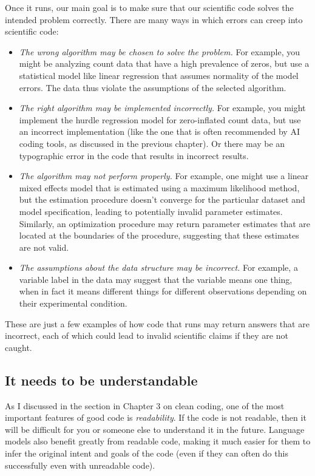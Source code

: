 Once it runs, our main goal is to make sure that our scientific code solves the intended problem correctly.  There are many ways in which errors can creep into scientific code:

\begin{itemize}
\item \textit{The wrong algorithm may be chosen to solve the problem.} For example, you might be analyzing count data that have a high prevalence of zeros, but use a statistical model like linear regression that assumes normality of the model errors.  The data thus violate the assumptions of the selected algorithm.
\item \textit{The right algorithm may be implemented incorrectly.}  For example, you might implement the hurdle regression model for zero-inflated count data, but use an incorrect implementation (like the one that is often recommended by AI coding tools, as discussed in the previous chapter).  Or there may be an typographic error in the code that results in incorrect results.
\item \textit{The algorithm may not perform properly.} For example, one might use a linear mixed effects model that is estimated using a maximum likelihood method, but the estimation procedure doesn't converge for the particular dataset and model specification, leading to potentially invalid parameter estimates.  Similarly, an optimization procedure may return parameter estimates that are located at the boundaries of the procedure, suggesting that these estimates are not valid.
\item \textit{The assumptions about the data structure may be incorrect.}  For example, a variable label in the data may suggest that the variable means one thing, when in fact it means different things for different observations depending on their experimental condition.
\end{itemize}

These are just a few examples of how code that runs may return answers that are incorrect, each of which could lead to invalid scientific claims if they are not caught.

\subsection{It needs to be understandable}

As I discussed in the section in Chapter 3 on clean coding, one of the most important features of good code is \textit{readability}.  If the code is not readable, then it will be difficult for you or someone else to understand it in the future.  Language models also benefit greatly from readable code, making it much easier for them to infer the original intent and goals of the code (even if they can often do this successfully even with unreadable code).

